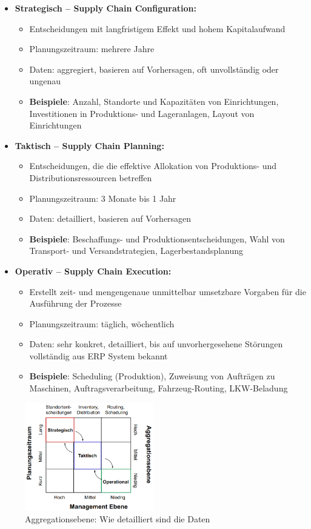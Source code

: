 \begin{itemize}
	\item \textbf{Strategisch – Supply Chain Configuration:}
	\begin{itemize}
		\item Entscheidungen mit langfristigem Effekt und hohem Kapitalaufwand
		\item Planungszeitraum: mehrere Jahre
		\item Daten: aggregiert, basieren auf Vorhersagen, oft unvollständig oder ungenau
		\item \textbf{Beispiele}: Anzahl, Standorte und Kapazitäten von Einrichtungen, Investitionen in Produktions- und Lageranlagen, Layout von Einrichtungen
	\end{itemize}
	\item \textbf{Taktisch – Supply Chain Planning:}
	\begin{itemize}
		\item Entscheidungen, die die effektive Allokation von Produktions- und
		Distributionsressourcen betreffen
		\item Planungszeitraum: 3 Monate bis 1 Jahr
		\item Daten: detailliert, basieren auf Vorhersagen
		\item \textbf{Beispiele}: Beschaffungs- und Produktionsentscheidungen, Wahl von Transport- und Versandstrategien, Lagerbestandsplanung
	\end{itemize}
	\item \textbf{Operativ – Supply Chain Execution:}
	\begin{itemize}
		\item Erstellt zeit- und mengengenaue unmittelbar umsetzbare Vorgaben
		für die Ausführung der Prozesse
		\item Planungszeitraum: täglich, wöchentlich
		\item Daten: sehr konkret, detailliert, bis auf unvorhergesehene Störungen
		vollständig aus ERP System bekannt
		\item \textbf{Beispiele}: Scheduling (Produktion), Zuweisung von Aufträgen zu Maschinen, Auftragsverarbeitung, Fahrzeug-Routing, LKW-Beladung
	\end{itemize}
\end{itemize}
\begin{figure}[h]
\begin{center}
	\includegraphics[width=0.5\textwidth]{images/scm-ebenen.png}
	\caption*{Aggregationsebene: Wie detailliert sind die Daten}
\end{center}
\end{figure}

